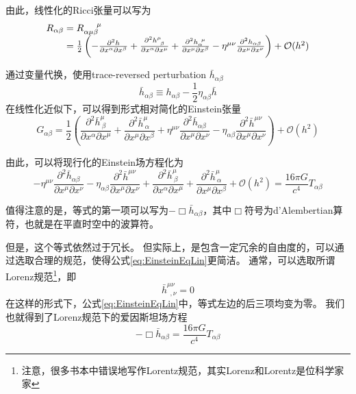 由此，线性化的Ricci张量可以写为
\begin{equation}\label{eq:RicciTensorLin}
\begin{array}{r@{}l}
  R_{\alpha\beta} &{}= R_{\alpha\mu\beta} ^{\quad\ \mu}\\
                  &{}= \frac{1}{2}\left(- \frac{\partial^2 h}{\partial x^\alpha \partial x^\beta} + \frac{\partial^2 h^\mu_{~\beta}}{\partial x^\alpha \partial x^\mu} + \frac{\partial^2 h_{\alpha}^{~\mu}}{\partial x^\mu \partial x^\beta} - \eta^{\mu\nu}\frac{\partial^2 h_{\alpha\beta}}{\partial x^\mu \partial x^\nu}  \right)+ \mathcal{O}(h^2)
\end{array}
\end{equation}

通过变量代换，使用trace-reversed perturbation $\bar{h}_{\alpha\beta}$
\begin{equation}\label{eq:TraRev} 
  \bar{h}_{\alpha\beta} \equiv h_{\alpha\beta} - \frac{1}{2}\eta_{\alpha\beta}\bar{h}
\end{equation}
在线性化近似下，可以得到形式相对简化的Einstein张量
\begin{equation}\label{eq:EinsteinTensorLin}
  G_{\alpha\beta}  = \frac{1}{2}\left( \frac{\partial^2 \bar{h}^\mu_{~\beta}}{\partial x^\alpha \partial x^\mu} + \frac{\partial^2 \bar{h}^\mu_{~\alpha}}{\partial x^\mu \partial x^\beta} + \eta^{\mu\nu}\frac{\partial^2 \bar{h}_{\alpha\beta}}{\partial x^\mu \partial x^\nu} - \eta_{\alpha\beta}\frac{\partial^2 \bar{h}^{\mu\nu}}{\partial x^\mu \partial x^\nu}  \right)+ \mathcal{O}(h^2)
\end{equation}

由此，可以将现行化的Einstein场方程化为
\begin{equation}\label{eq:EinsteinEqLin}
  - \eta^{\mu\nu} \frac{\partial^2 \bar{h}_{\alpha\beta}}{\partial x^\mu \partial x^\nu} 
  - \eta_{\alpha\beta}\frac{\partial^2 \bar{h}^{\mu\nu}}{\partial x^\mu \partial x^\nu} 
  + \frac{\partial^2 \bar{h}^\mu_{~\beta}}{\partial x^\alpha \partial x^\mu} 
  + \frac{\partial^2 \bar{h}^{\mu}_{~\alpha}}{\partial x^\mu \partial x^\beta}  
  + \mathcal{O}(h^2) = \frac{16\pi G}{c^4} T_{\alpha\beta}
\end{equation}

值得注意的是，等式的第一项可以写为$-\Box\bar{h}_{\alpha\beta}$，其中$\Box$符号为d’Alembertian算符，也就是在平直时空中的波算符。

但是，这个等式依然过于冗长。
但实际上，\GR 是包含一定冗余的自由度的，可以通过选取合理的规范，使得公式\ref{eq:EinsteinEqLin}更简洁。
通常，可以选取所谓Lorenz规范\footnote{注意，很多书本中错误地写作Lorentz规范，其实Lorenz和Lorentz是位科学家家}，即
\begin{equation}\label{eq:LorenzGauge}
  \bar{h}^{\mu\nu}_{~~,\nu} = 0
\end{equation}
在这样的形式下，公式\ref{eq:EinsteinEqLin}中，等式左边的后三项均变为零。
我们也就得到了Lorenz规范下的爱因斯坦场方程
\begin{equation}\label{eq:EinsteinEqLorenzGauge}
  -\Box\bar{h}_{\alpha\beta}= \frac{16\pi G}{c^4} T_{\alpha\beta}
\end{equation}

